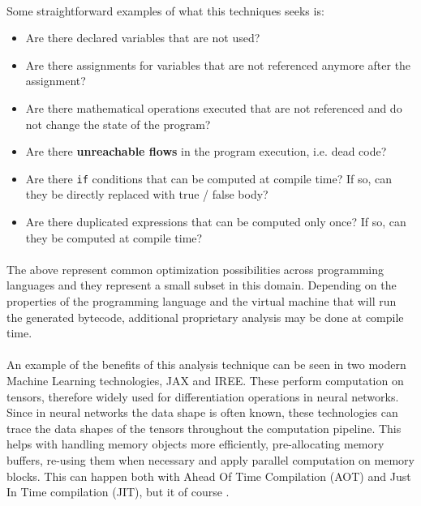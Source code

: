 \paragraph*{}
Some straightforward examples of what this techniques seeks is:
\begin{itemize}
    \item Are there declared variables that are not used?
    \item Are there assignments for variables that are not referenced anymore after the assignment?
    \item Are there mathematical operations executed that are not referenced and do not change the state of the program?
    \item Are there \textbf{unreachable flows} in the program execution, i.e. dead code?
    \item Are there \lstinline[columns=fixed]{if} conditions that can be computed at compile time? If so, can they be directly replaced with true / false body?
    \item Are there duplicated expressions that can be computed only once? If so, can they be computed at compile time?
\end{itemize}

\paragraph*{}
The above represent common optimization possibilities across programming languages and they represent a small subset in this domain. Depending on the properties of the programming language and the virtual machine that will run the generated bytecode, additional proprietary analysis may be done at compile time.

\paragraph*{}
An example of the benefits of this analysis technique can be seen in two modern Machine Learning technologies, JAX and IREE. These perform computation on tensors, therefore widely used for differentiation operations in neural networks. Since in neural networks the data shape is often known, these technologies can trace the data shapes of the tensors throughout the computation pipeline. This helps with handling memory objects more efficiently, pre-allocating memory buffers, re-using them when necessary and apply parallel computation on memory blocks. This can happen both with Ahead Of Time Compilation (AOT) and Just In Time compilation (JIT), but it of course \cite[requires array shapes to be static \& known at compile time]{jax-to-jit-or-not-to-jit}.

